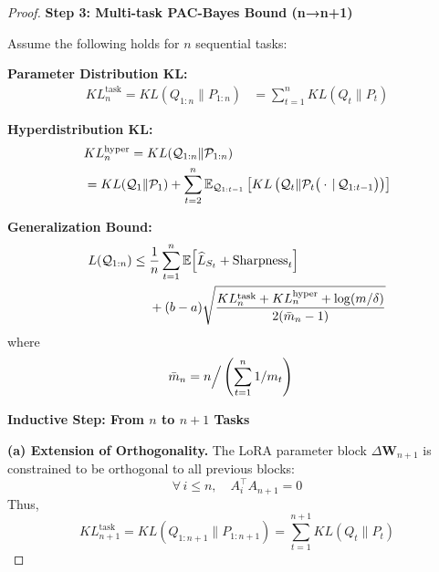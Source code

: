 \documentclass[letterpaper]{article} %
\begin{document}
\begin{proof}
\textbf{Step 3: Multi-task PAC-Bayes Bound (n→n+1)}

Assume the following holds for $n$ sequential tasks:


\textbf{Parameter Distribution KL:}
    \begin{align}
     KL^{\text{task}}_n=KL(Q_{1:n} \| P_{1:n}) 
    &= \sum_{t=1}^n KL(Q_t \| P_t)
    \end{align}

 
\textbf{Hyperdistribution KL:}
    \begin{align}
    &KL^{\text{hyper}}_n=KL(\mathcal{Q}_{1:n} \| \mathcal{P}_{1:n})  \\
    &= KL(\mathcal{Q}_1 \| \mathcal{P}_1) \notag 
      + \sum_{t=2}^n 
        \mathbb{E}_{\mathcal{Q}_{1:t-1}} \left[ 
            KL\left(\mathcal{Q}_t \| \mathcal{P}_t\big(\cdot\,|\,\mathcal{Q}_{1:t-1}\big)\right) 
        \right]
    \end{align}

\textbf{Generalization Bound:}
    \begin{align}
    L(\mathcal{Q}_{1:n}) \leq\; & \frac{1}{n} \sum_{t=1}^n 
        \mathbb{E} \Big[
            \widehat{L}_{S_t} + \mathrm{Sharpness}_t
        \Big] \notag \\
    & + (b-a) \sqrt{
        \frac{KL^{\text{task}}_n +KL^{\text{hyper}}_n + \log(m/\delta)}{2(\bar{m}_n - 1)}
    }
    \end{align}
    where
    \begin{align}
    \bar{m}_n &= n \Big/ \left(\sum_{t=1}^n 1/m_t\right) \notag 
    \end{align}

\textbf{Inductive Step: From $n$ to $n+1$ Tasks}


\textbf{(a) Extension of Orthogonality.}
The LoRA parameter block $\Delta\mathbf{W}_{n+1}$ is constrained to be orthogonal to all previous blocks:
    \begin{equation}
        \forall\, i \leq n, \quad A_i^\top A_{n+1} = 0
    \end{equation}
    Thus,
    \begin{equation}
        KL^{\text{task}}_{n+1}=KL(Q_{1:n+1} \| P_{1:n+1}) = \sum_{t=1}^{n+1} KL(Q_t \| P_t)
    \end{equation}


\end{proof}
\end{document}

